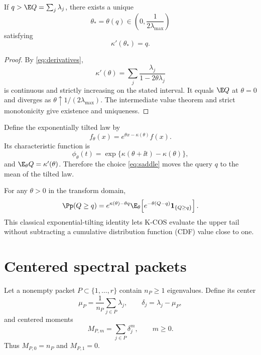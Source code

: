 \begin{theorem}
\label{thm:saddle}
If $q>\E Q=\sum_j\lambda_j$, there exists a unique
\[
\theta_*=\theta(q)\in\left(0,\frac{1}{2\lambda_{\max}}\right)
\]
satisfying
\begin{equation}
\kappa'(\theta_*)=q.
\label{eq:saddle}
\end{equation}
\end{theorem}

\begin{proof}
By \eqref{eq:derivatives},
\[
\kappa'(\theta)=\sum_j\frac{\lambda_j}{1-2\theta\lambda_j}
\]
is continuous and strictly increasing on the stated interval. It equals $\E Q$ at $\theta=0$ and diverges as $\theta\uparrow1/(2\lambda_{\max})$. The intermediate value theorem and strict monotonicity give existence and uniqueness.
\end{proof}

Define the exponentially tilted law by
\begin{equation}
f_{\theta}(x)=e^{\theta x-\kappa(\theta)}f(x).
\label{eq:tilt-density}
\end{equation}
Its characteristic function is
\begin{equation}
\phi_{\theta}(t)
=\exp\{\kappa(\theta+\ii t)-\kappa(\theta)\},
\label{eq:tilt-cf}
\end{equation}
and $\E_{\theta}Q=\kappa'(\theta)$. Therefore the choice \eqref{eq:saddle} moves the query $q$ to the mean of the tilted law.

For any $\theta>0$ in the transform domain,
\begin{equation}
\Pp(Q\ge q)
=e^{\kappa(\theta)-\theta q}
\E_{\theta}\!\left[e^{-\theta(Q-q)}\mathbf 1_{\{Q\ge q\}}\right].
\label{eq:tilt-tail}
\end{equation}
This classical exponential-tilting identity lets K-COS evaluate the upper tail
without subtracting a cumulative distribution function (CDF) value close to one.

\section{Centered spectral packets}

Let a nonempty packet $P\subset\{1,\ldots,r\}$ contain $n_P\ge1$ eigenvalues. Define its center
\[
\mu_P=\frac{1}{n_P}\sum_{j\in P}\lambda_j,
\qquad
\delta_j=\lambda_j-\mu_P,
\]
and centered moments
\begin{equation}
M_{P,m}=\sum_{j\in P}\delta_j^m,
\qquad m\ge0.
\label{eq:centeredmoments}
\end{equation}
Thus $M_{P,0}=n_P$ and $M_{P,1}=0$.

